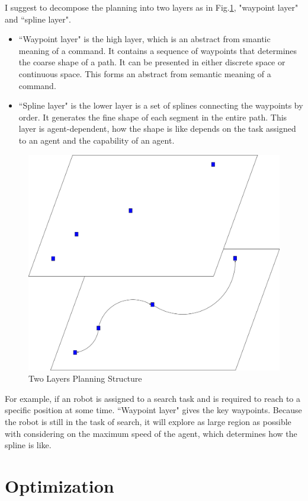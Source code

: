 \documentclass[12pt]{article}
\begin{document}
I suggest to decompose the planning into two layers as in Fig.\ref{fig:planningLayer}, "waypoint layer" and ``spline layer".
\begin{itemize}
\item ``Waypoint layer" is the high layer, which is an abstract from smantic meaning of a command. It contains a sequence of waypoints that determines the coarse shape of a path. It can be presented in either discrete space or continuous space. This forms an abstract from semantic meaning of a command. 
\item ``Spline layer" is the lower layer is a set of splines connecting the waypoints by order. It generates the fine shape of each segment in the entire path. This layer is agent-dependent, how the shape is like depends on the task assigned to an agent and the capability of an agent. 
\end{itemize}

\begin{figure}
\centering
\includegraphics[width=0.4\linewidth]{./planningLayer}
\caption{Two Layers Planning Structure}
\label{fig:planningLayer}
\end{figure}

For example, if an robot is assigned to a search task and is required to reach to a specific position at some time. ``Waypoint layer" gives the key waypoints. Because the robot is still in the task of search, it will explore as large region as possible with considering on the maximum speed of the agent, which determines how the spline is like.

\section{Optimization}
\end{document}
